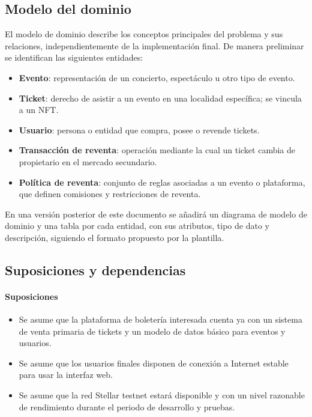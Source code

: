 \documentclass[12pt,letterpaper]{article}
\begin{document}
\subsection{Modelo del dominio}

El modelo de dominio describe los conceptos principales del problema y sus
relaciones, independientemente de la implementación final. De manera preliminar
se identifican las siguientes entidades:

\begin{itemize}
    \item \textbf{Evento}: representación de un concierto, espectáculo u otro
          tipo de evento.
    \item \textbf{Ticket}: derecho de asistir a un evento en una localidad
          específica; se vincula a un NFT.
    \item \textbf{Usuario}: persona o entidad que compra, posee o revende
          tickets.
    \item \textbf{Transacción de reventa}: operación mediante la cual un
          ticket cambia de propietario en el mercado secundario.
    \item \textbf{Política de reventa}: conjunto de reglas asociadas a un
          evento o plataforma, que definen comisiones y restricciones de
          reventa.
\end{itemize}


En una versión posterior de este documento se añadirá un diagrama de modelo de
dominio y una tabla por cada entidad, con sus atributos, tipo de dato y
descripción, siguiendo el formato propuesto por la plantilla.

\subsection{Suposiciones y dependencias}

\paragraph{Suposiciones}

\begin{itemize}
    \item Se asume que la plataforma de boletería interesada cuenta ya con un
          sistema de venta primaria de tickets y un modelo de datos básico para
          eventos y usuarios.
    \item Se asume que los usuarios finales disponen de conexión a Internet
          estable para usar la interfaz web.
    \item Se asume que la red Stellar testnet estará disponible y con un nivel
          razonable de rendimiento durante el periodo de desarrollo y pruebas.
\end{itemize}
\end{document}
